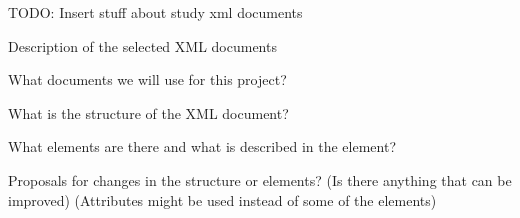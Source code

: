 TODO: Insert stuff about study xml documents

Description of the selected XML documents

What documents we will use for this project?

What is the structure of the XML document? 

What elements are there and what is described in the element?

Proposals for changes in the structure or elements?
(Is there anything that can be improved)
(Attributes might be used instead of some of the elements)